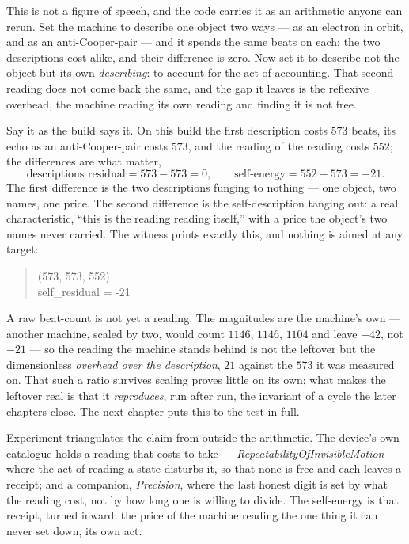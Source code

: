 This is not a figure of speech, and the code carries it as an arithmetic anyone can rerun.
Set the machine to describe one object two ways --- as an electron in orbit, and as an anti-Cooper-pair --- and it spends
the same beats on each: the two descriptions cost alike, and their difference is zero.
Now set it to describe not the object but its own \emph{describing}: to account for the act of accounting.
That second reading does not come back the same, and the gap it leaves is the reflexive overhead, the machine reading its
own reading and finding it is not free.

Say it as the build says it.
On this build the first description costs $573$ beats, its echo as an anti-Cooper-pair costs $573$, and the reading of the
reading costs $552$; the differences are what matter,
\[
  \text{descriptions residual} = 573 - 573 = 0, \qquad
  \text{self-energy} = 552 - 573 = -21 .
\]
The first difference is the two descriptions funging to nothing --- one object, two names, one price.
The second difference is the self-description tanging out: a real characteristic, ``this is the reading reading itself,''
with a price the object's two names never carried.
The witness prints exactly this, and nothing is aimed at any target:
\begin{quote}\ttfamily
(573, 573, 552)\\
self\_residual = -21
\end{quote}

A raw beat-count is not yet a reading.
The magnitudes are the machine's own --- another machine, scaled by two, would count $1146$, $1146$, $1104$ and leave
$-42$, not $-21$ --- so the reading the machine stands behind is not the leftover but the dimensionless \emph{overhead over
the description}, $21$ against the $573$ it was measured on.
That such a ratio survives scaling proves little on its own; what makes the leftover real is that it \emph{reproduces},
run after run, the invariant of a cycle the later chapters close.
The next chapter puts this to the test in full.

Experiment triangulates the claim from outside the arithmetic.
The device's own catalogue holds a reading that costs to take --- \emph{RepeatabilityOfInvisibleMotion} --- where the act
of reading a state disturbs it, so that none is free and each leaves a receipt; and a companion,
\emph{Precision}, where the last honest digit is set by what the reading cost, not by how long one is willing to divide.
The self-energy is that receipt, turned inward: the price of the machine reading the one thing it can never set down, its
own act.

